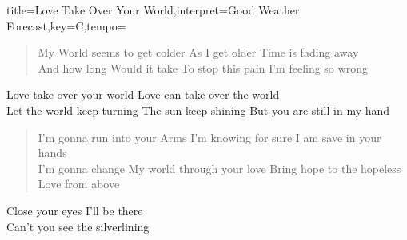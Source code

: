 \documentclass{leadsheet-modern}
\begin{document}
\begin{song}{title={Love Take Over Your World},interpret={Good Weather Forecast},key={C},tempo={}}

\begin{schedule}
\end{schedule}

\begin{verse}
My World seems to get colder
As I get older
Time is fading away \\
And how long
Would it take
To stop this pain
I'm feeling so wrong
\end{verse}

\begin{chorus}
Love take over your world
Love can take over the world \\
Let the world keep turning
The sun keep shining
But you are still in my hand
\end{chorus}

\begin{verse}
I'm gonna run into your Arms
I'm knowing for sure
I am save in your hands \\
I'm gonna change
My world through your love
Bring hope to the hopeless
Love from above
\end{verse}

\begin{bridge}
Close your eyes
I'll be there \\
Can't you see the silverlining
\end{bridge}

\end{song}
\end{document}
